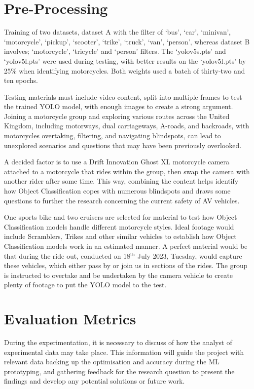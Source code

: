 \documentclass[12pt]{report} %
\begin{document}
	\section{Pre-Processing}
		Training of two datasets, dataset A with the filter of `bus', `car', `minivan', `motorcycle', `pickup', `scooter', `trike', `truck', `van', `person', whereas dataset B involves; `motorcycle', `tricycle' and `person' filters. The `yolov5s.pts' and `yolov5l.pts' were used during testing, with better results on the `yolov5l.pts' by 25\% when identifying motorcycles. Both weights used a batch of thirty-two and ten epochs.

		Testing materials must include video content, split into multiple frames to test the trained YOLO model, with enough images to create a strong argument. Joining a motorcycle group and exploring various routes across the United Kingdom, including motorways, dual carriageways, A-roads, and backroads, with motorcycles overtaking, filtering, and navigating blindspots, can lead to unexplored scenarios and questions that may have been previously overlooked.
					
		A decided factor is to use a Drift Innovation Ghost XL motorcycle camera attached to a motorcycle that rides within the group, then swap the camera with another rider after some time. This way, combining the content helps identify how Object Classification copes with numerous blindspots and draws some questions to further the research concerning the current safety of AV vehicles. 
		
		One sports bike and two cruisers are selected for material to test how Object Classification models handle different motorcycle styles. Ideal footage would include Scramblers, Trikes and other similar vehicles to establish how Object Classification models work in an estimated manner. A perfect material would be that during the ride out, conducted on 18$^\text{th}$ July 2023, Tuesday, would capture these vehicles, which either pass by or join us in sections of the rides. The group is instructed to overtake and be undertaken by the camera vehicle to create plenty of footage to put the YOLO model to the test.

	\section{Evaluation Metrics}
        During the experimentation, it is necessary to discuss of how the analyst of experimental data may take place. This information will guide the project with relevant data backing up the optimisation and accuracy during the ML prototyping, and gathering feedback for the research question to present the findings and develop any potential solutions or future work.
\end{document}
